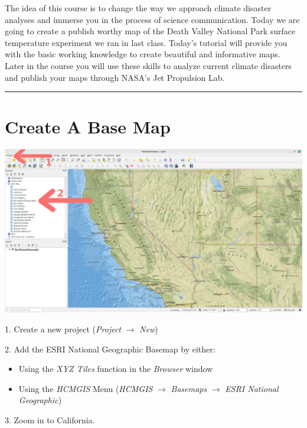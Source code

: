 \documentclass[oneside,a4paper,11pt,explicit]{book}
\begin{document}
\vspace{1 em}

The idea of this course is to change the way we approach climate disaster analyses and immerse you in the process of science communication. Today we are going to create a publish worthy map of the Death Valley National Park surface temperature experiment we ran in last class. Today's tutorial will provide you with the basic working knowledge to create beautiful and informative maps. Later in the course you will use these skills to analyze current climate disasters and publish your maps through NASA's Jet Propulsion Lab.

\vspace{1 em}

\hrule

\section{Create A Base Map}

\centerline{\includegraphics[width=\textwidth]{Basemap.png}}

1. Create a new project (\textit{Project} $\rightarrow$ \textit{New})

\begin{singlespace}
2. Add the ESRI National Geographic Basemap by either:
	\begin{itemize}
		\item Using the \textit{XYZ Tiles} function in the \textit{Browser} window
		\item Using the \textit{HCMGIS} Menu (\textit{HCMGIS} $\rightarrow$ \textit{Basemaps} $\rightarrow$ \textit{ESRI National Geographic})
	\end{itemize}
\end{singlespace}

3. Zoom in to California.
\end{document}
